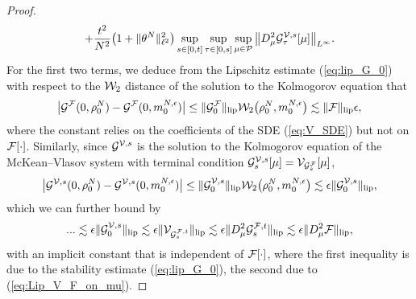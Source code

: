 \begin{proof}
\begin{equation}
\begin{split}
    + \frac{t^2}{N^2}\big(1 + \|\theta^N\|^2_{\ell^2}\big)\sup_{s \in [0,t]}\sup_{\tau \in [0,s]}\sup_{\mu \in \mathcal{P}} \big\|D^2_{\mu}\mathcal{G}_{\tau}^{\mathcal{V},s}[\mu]\big\|_{L^{\infty}}.
    \end{split}
\end{equation}
For the first two terms, we deduce from the Lipschitz estimate (\ref{eq:lip_G_0}) with respect to the $\mathcal{W}_2$ distance of the solution to the Kolmogorov equation that 
\begin{align*}
    \big|\mathcal{G}^{\mathcal{F}}(0,\rho^N_0) - \mathcal{G}^{\mathcal{F}}(0,m_0^{N,\epsilon})\big| \leq \|\mathcal{G}^{\mathcal{F}}_0\|_{\operatorname{lip}} \mathcal{W}_{2}\big(\rho^N_0, m_0^{N,\epsilon}\big) \lesssim \|\mathcal{F}\|_{\operatorname{lip}}\epsilon,
\end{align*}
where the constant relies on the coefficients of the SDE (\ref{eq:V_SDE}) but not on $\mathcal{F}[\cdot]$.
Similarly, since $\mathcal{G}^{\mathcal{V},s}$ is the solution to the Kolmogorov equation of the McKean–Vlasov system with terminal condition $\mathcal{G}_s^{\mathcal{V},s}[\mu] = \mathcal{V}_{\mathcal{G}_s^{\mathcal{F}}}[\mu]$, 
\begin{align*}
    \big|\mathcal{G}^{\mathcal{V},s}(0,\rho^N_0) - \mathcal{G}^{\mathcal{V},s}(0,m_0^{N,\epsilon})\big| \leq \|\mathcal{G}^{\mathcal{V},s}_0\|_{\operatorname{lip}} \mathcal{W}_{2}\big(\rho^N_0, m_0^{N,\epsilon}\big) \lesssim \epsilon\|\mathcal{G}^{\mathcal{V},s}_0\|_{\operatorname{lip}},
\end{align*}
which we can further bound by 
\begin{align*}
    ... \lesssim \epsilon\|\mathcal{G}^{\mathcal{V},s}_0\|_{\operatorname{lip}} \lesssim \epsilon\|\mathcal{V}_{\mathcal{G}_s^{\mathcal{F},t}}\|_{\operatorname{lip}} \lesssim \epsilon \|D^2_{\mu}\mathcal{G}_s^{\mathcal{F},t}\|_{\operatorname{lip}}\lesssim \epsilon \|D^2_{\mu}\mathcal{F}\|_{\operatorname{lip}},
\end{align*}
with an implicit constant that is independent of $\mathcal{F}[\cdot]$, where the first inequality is due to the stability estimate (\ref{eq:lip_G_0}), the second due to (\ref{eq:Lip_V_F_on_mu}).

\end{proof}
